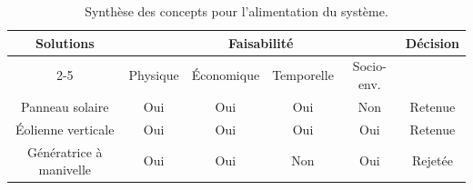 \renewcommand{\arraystretch}{1.3}

\begin{table}[H]
  \centering
  \begin{tabular}{|c|c|c|c|c|c|}
    \hline
    \multirow{2}{*}{\textbf{Solutions}}
    & \multicolumn{4}{c|}{\textbf{Faisabilité}}
    & \multirow{2}{*}{\textbf{Décision}}
    \\ \cline{2-5}
    & Physique                                  & Économique & Temporelle & Socio-env. &         \\ \hline
    Panneau solaire         & Oui                                       & Oui        & Oui        & Non        & Retenue \\ \hline
    Éolienne verticale      & Oui                                       & Oui        & Oui        & Oui        & Retenue \\ \hline
    Génératrice à manivelle & Oui                                       & Oui        & Non        & Oui        & Rejetée \\ \hline
  \end{tabular}
  \caption{Synthèse des concepts pour l'alimentation du système.}
  \label{tab:tableau-synthese-fonction-3}
\end{table}
